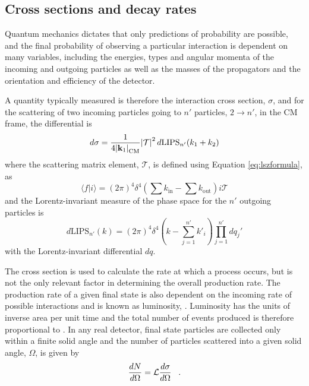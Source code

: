 \subsection{Cross sections and decay rates}

 Quantum mechanics dictates that 
  only predictions of probability are possible,
  and the final probability of observing
  a particular interaction
  is dependent on many variables, including
  the energies, types and angular momenta of the incoming
  and outgoing particles as well as
  the masses of the propagators
  and the orientation and efficiency of the detector.

 A quantity typically measured is therefore the 
  interaction cross section, $\sigma$,
  and for the scattering of two incoming 
  particles going to $n'$ particles, $2\rightarrow n'$,
  in the CM frame, the differential is
\begin{equation}\label{eq:dsigma}
 d\sigma = \frac{1}{4\abs{\mathbf{k}_1}_{\mathrm{CM}}}\abs{\mathcal{T}}^2 
  d\mathrm{LIPS}_{n'}(k_1 + k_2)
\end{equation}
  where the scattering matrix element, $\mathcal{T}$,
  is defined using Equation \ref{eq:lszformula}, as 
\begin{equation}\label{eq:matrixelement}
\langle f | i \rangle = (2\pi)^4\delta^4\left(\sum k_{\mathrm{in}}-\sum k_{\mathrm{out}}\right)
  i \mathcal{T}
\end{equation}
  and the Lorentz-invariant measure of the 
  phase space for the $n'$ outgoing particles is
\begin{equation}\label{eq:dlips}
 d\mathrm{LIPS}_{n'}(k) = (2\pi)^4 \delta^4
  \left(k - \sum_{j=1}^{n'}k'_i \right )
  \prod_{j=1}^{n'}dq_j'
\end{equation}
 with the Lorentz-invariant differential $dq$.

 The cross section is used to calculate the rate
  at which a process occurs, but is
  not the only relevant factor in determining
  the overall production rate.
 The production rate of a given final state
  is also dependent on the incoming
  rate of possible interactions and is 
  known as luminosity, \lumi.
 Luminosity has the units of inverse area per unit time
  and the total number of events produced
  is therefore proportional to \tlumi.
 In any real detector, final state particles
  are collected only within a finite
  solid angle and the number of particles
  scattered into a given solid angle, $\Omega$, is given by
\begin{equation}\label{eq:lumidef}
 \frac{dN}{d\Omega} = \mathcal L \frac{d\sigma}{d\Omega}\;\;\;.
\end{equation}


